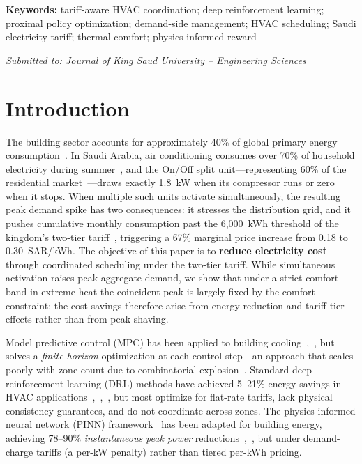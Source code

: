 \documentclass[12pt,a4paper]{article}
\begin{document}
\begin{abstract}
\end{abstract}

\noindent\textbf{Keywords:} tariff-aware HVAC coordination; deep reinforcement learning; proximal policy optimization; demand-side management; HVAC scheduling; Saudi electricity tariff; thermal comfort; physics-informed reward

\vspace{0.5em}\noindent\textit{Submitted to: Journal of King Saud University -- Engineering Sciences}\vspace{1em}

\section{Introduction}
\label{sec:intro}

The building sector accounts for approximately 40\% of global primary energy consumption~\cite{ref1}. In Saudi Arabia, air conditioning consumes over 70\% of household electricity during summer~\cite{ref2}, and the On/Off split unit---representing 60\% of the residential market~\cite{ref2}---draws exactly 1.8~kW when its compressor runs or zero when it stops. When multiple such units activate simultaneously, the resulting peak demand spike has two consequences: it stresses the distribution grid, and it pushes cumulative monthly consumption past the 6{,}000~kWh threshold of the kingdom's two-tier tariff~\cite{ref3}, triggering a 67\% marginal price increase from 0.18 to 0.30~SAR/kWh. The objective of this paper is to \textbf{reduce electricity cost} through coordinated scheduling under the two-tier tariff. While simultaneous activation raises peak aggregate demand, we show that under a strict comfort band in extreme heat the coincident peak is largely fixed by the comfort constraint; the cost savings therefore arise from energy reduction and tariff-tier effects rather than from peak shaving.

Model predictive control (MPC) has been applied to building cooling~\cite{ref4},~\cite{ref5}, but solves a \textit{finite-horizon} optimization at each control step---an approach that scales poorly with zone count due to combinatorial explosion~\cite{ref6}. Standard deep reinforcement learning (DRL) methods have achieved 5--21\% energy savings in HVAC applications~\cite{ref7},~\cite{ref8},~\cite{ref9}, but most optimize for flat-rate tariffs, lack physical consistency guarantees, and do not coordinate across zones. The physics-informed neural network (PINN) framework~\cite{ref36} has been adapted for building energy, achieving 78--90\% \textit{instantaneous peak power} reductions~\cite{ref10},~\cite{ref11}, but under demand-charge tariffs (a per-kW penalty) rather than tiered per-kWh pricing.
\end{document}
